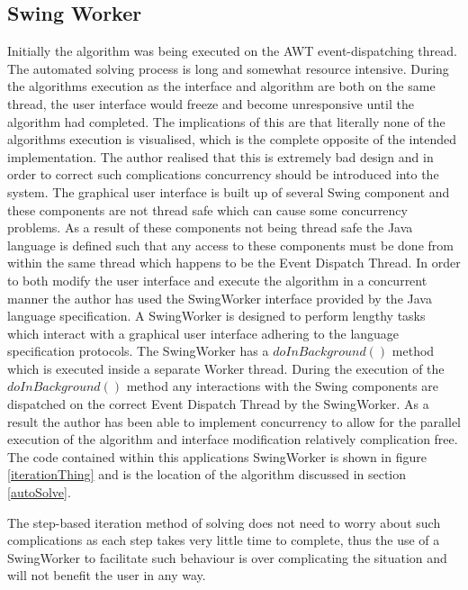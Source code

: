 \subsection{Swing Worker}
\label{swingmeupm8}
Initially the algorithm was being executed on the AWT event-dispatching thread. The automated solving process is long and somewhat resource intensive. During the algorithms execution as the interface and algorithm are both on the same thread, the user interface would freeze and become unresponsive until the algorithm had completed. The implications of this are that literally none of the algorithms execution is visualised, which is the complete opposite of the intended implementation. The author realised that this is extremely bad design and in order to correct such complications concurrency should be introduced into the system. The graphical user interface is built up of several Swing component and these components are not thread safe which can cause some concurrency problems. As a result of these components not being thread safe the Java language is defined such that any access to these components must be done from within the same thread which happens to be the Event Dispatch Thread. In order to both modify the user interface and execute the algorithm in a concurrent manner the author has used the SwingWorker interface provided by the Java language specification. A SwingWorker is designed to perform lengthy tasks which interact with a graphical user interface adhering to the language specification protocols. The SwingWorker has a $doInBackground()$ method which is executed inside a separate Worker thread. During the execution of the $doInBackground()$ method any interactions with the Swing components are dispatched on the correct Event Dispatch Thread by the SwingWorker. As a result the author has been able to implement concurrency to allow for the parallel execution of the algorithm and interface modification relatively complication free. The code contained within this applications SwingWorker is shown in figure \ref{iterationThing} and is the location of the algorithm discussed in section \ref{autoSolve}. 

The step-based iteration method of solving does not need to worry about such complications as each step takes very little time to complete, thus the use of a SwingWorker to facilitate such behaviour is over complicating the situation and will not benefit the user in any way.

